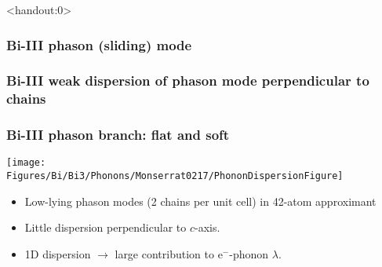 \begin{frame}<handout:0>
  \frametitle{Bi-III phason (sliding) mode}
  \centerline{}
  \end{frame}
  

\begin{frame}
\frametitle{Bi-III weak dispersion of phason mode perpendicular to chains}
\centerline{}

\end{frame}

\begin{frame}
\frametitle{Bi-III phason branch: flat and soft}
\centerline{\texttt{[image: \\Figures/Bi/Bi3/Phonons/Monserrat0217/PhononDispersionFigure]}}
\begin{itemize}
\item
Low-lying phason modes (2 chains per unit cell) in
42-atom approximant
\item
Little dispersion perpendicular to $c$-axis. %
\item
1D dispersion $\rightarrow$ large contribution to e$^-$-phonon $\lambda$.
\end{itemize}

\end{frame}



